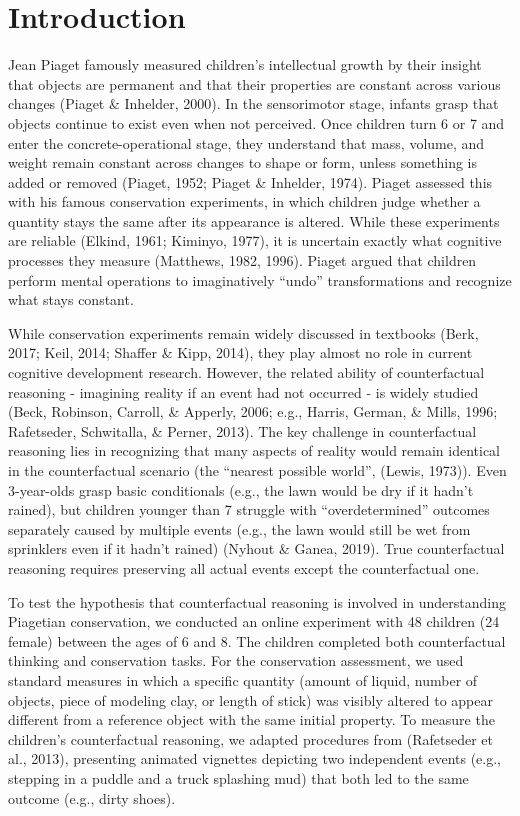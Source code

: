 \documentclass[
  doc]{apa6}
\begin{document}
\section{Introduction}\label{introduction}

Jean Piaget famously measured children's intellectual growth by their insight that objects are permanent and that their properties are constant across various changes (Piaget \& Inhelder, 2000).
In the sensorimotor stage, infants grasp that objects continue to exist even when not perceived.
Once children turn 6 or 7 and enter the concrete-operational stage, they understand that mass, volume, and weight remain constant across changes to shape or form, unless something is added or removed (Piaget, 1952; Piaget \& Inhelder, 1974).
Piaget assessed this with his famous conservation experiments, in which children judge whether a quantity stays the same after its appearance is altered.
While these experiments are reliable (Elkind, 1961; Kiminyo, 1977), it is uncertain exactly what cognitive processes they measure (Matthews, 1982, 1996).
Piaget argued that children perform mental operations to imaginatively ``undo'' transformations and recognize what stays constant.

While conservation experiments remain widely discussed in textbooks (Berk, 2017; Keil, 2014; Shaffer \& Kipp, 2014), they play almost no role in current cognitive development research.
However, the related ability of counterfactual reasoning - imagining reality if an event had not occurred - is widely studied (Beck, Robinson, Carroll, \& Apperly, 2006; e.g., Harris, German, \& Mills, 1996; Rafetseder, Schwitalla, \& Perner, 2013).
The key challenge in counterfactual reasoning lies in recognizing that many aspects of reality would remain identical in the counterfactual scenario (the ``nearest possible world'', (Lewis, 1973)).
Even 3-year-olds grasp basic conditionals (e.g., the lawn would be dry if it hadn't rained), but children younger than 7 struggle with ``overdetermined'' outcomes separately caused by multiple events (e.g., the lawn would still be wet from sprinklers even if it hadn't rained) (Nyhout \& Ganea, 2019).
True counterfactual reasoning requires preserving all actual events except the counterfactual one.

To test the hypothesis that counterfactual reasoning is involved in understanding Piagetian conservation, we conducted an online experiment with 48 children (24 female) between the ages of 6 and 8.
The children completed both counterfactual thinking and conservation tasks.
For the conservation assessment, we used standard measures in which a specific quantity (amount of liquid, number of objects, piece of modeling clay, or length of stick) was visibly altered to appear different from a reference object with the same initial property.
To measure the children's counterfactual reasoning, we adapted procedures from (Rafetseder et al., 2013), presenting animated vignettes depicting two independent events (e.g., stepping in a puddle and a truck splashing mud) that both led to the same outcome (e.g., dirty shoes).
\end{document}
